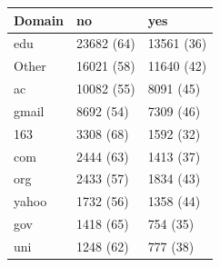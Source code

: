 \begin{table}[ht]
\centering
\begin{tabular}{lll}
 Domain & no & yes \\ 
  \hline
edu & 23682 (64) & 13561 (36) \\ 
  Other & 16021 (58) & 11640 (42) \\ 
  ac & 10082 (55) & 8091 (45) \\ 
  gmail & 8692 (54) & 7309 (46) \\ 
  163 & 3308 (68) & 1592 (32) \\ 
  com & 2444 (63) & 1413 (37) \\ 
  org & 2433 (57) & 1834 (43) \\ 
  yahoo & 1732 (56) & 1358 (44) \\ 
  gov & 1418 (65) & 754 (35) \\ 
  uni & 1248 (62) & 777 (38) \\ 
  \end{tabular}
\end{table}
